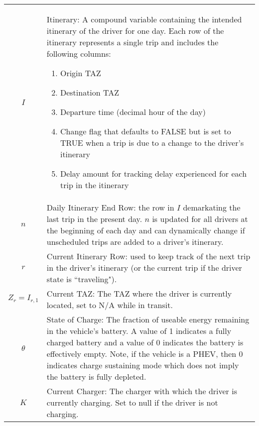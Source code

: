 \documentclass[journal]{IEEEtran}
\begin{document}
\begin{table}[!h]
\begin{tabular}{|cl|}
$I$ & \parbox[t]{\colmargin}{ \raggedright Itinerary: A compound variable containing the intended itinerary of the driver for one day.  Each row of the itinerary represents a single trip and includes the following columns: 
\begin{enumerate}
\item Origin TAZ
\item Destination TAZ
\item Departure time (decimal hour of the day)
\item Change flag that defaults to FALSE but is set to TRUE when a trip is due to a change to the driver's itinerary
\item Delay amount for tracking delay experienced for each trip in the itinerary 
\end{enumerate}
}\\
$n$ & \parbox[t]{\colmargin}{ Daily Itinerary End Row: the row in $I$ demarkating the last trip in the present day. $n$ is updated for all drivers at the beginning of each day and can dynamically change if unscheduled trips are added to a driver's itinerary.\raggedright }\\
$r$ & \parbox[t]{\colmargin}{ Current Itinerary Row: used to keep track of the next trip in the driver's itinerary (or the current trip if the driver state is ``traveling"). \raggedright }\\
$Z_r = I_{r,1}$ & \parbox[t]{\colmargin}{ \raggedright Current TAZ: The TAZ where the driver is currently located, set to N/A while in transit.}\\
$\theta$ & \parbox[t]{\colmargin}{ \raggedright State of Charge: The fraction of useable energy remaining in the vehicle's battery.  A value of 1 indicates a fully charged battery and a value of 0 indicates the battery is effectively empty.  Note, if the vehicle is a PHEV, then 0 indicates charge sustaining mode which does not imply the battery is fully depleted.}\\
$K$ & \parbox[t]{\colmargin}{ \raggedright Current Charger: The charger with which the driver is currently charging.  Set to null if the driver is not charging.}\\
\hline
\end{tabular}
\end{table}
\end{document}
